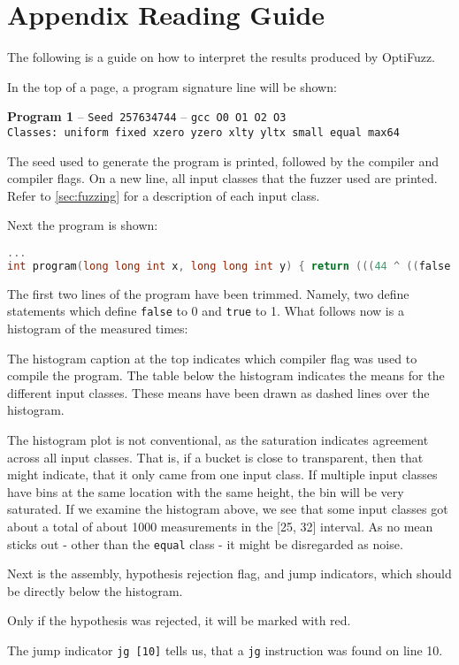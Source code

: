 \section*{Appendix Reading Guide}
The following is a guide on how to interpret the results produced by OptiFuzz. 

In the top of a page, a program signature line will be shown:
\begin{center}
    \textbf{Program 1} -- \texttt{Seed 257634744} -- \texttt{gcc O0 O1 O2 O3}\\\small\texttt{Classes: uniform fixed xzero yzero xlty yltx small equal max64}\\[2mm]
\end{center}
The seed used to generate the program is printed, followed by the compiler and compiler flags.
On a new line, all input classes that the fuzzer used are printed.
Refer to \ref{sec:fuzzing} for a description of each input class.

Next the program is shown:
\begin{lstlisting}[style=defstyle,language=C]
...
int program(long long int x, long long int y) { return (((44 ^ ((false >> (-874552120269441001 == x)) | ((53 * 29) >= (-5509653365268467218 ^ x)))) * 24) & (false + x)); }
\end{lstlisting}
The first two lines of the program have been trimmed. Namely, two define statements
which define \texttt{false} to 0 and \texttt{true} to 1.
What follows now is a histogram of the measured times:

The histogram caption at the top indicates which compiler flag was used to compile the program.
The table below the histogram indicates the means for the different input classes.
These means have been drawn as dashed lines over the histogram.

The histogram plot is not conventional, as the saturation indicates agreement across all input classes.
That is, if a bucket is close to transparent, then that might indicate, that it only came from one input class.
If multiple input classes have bins at the same location with the same height, the bin will be very saturated. 
If we examine the histogram above, we see that some input classes got about a total of about 1000 measurements in the [25, 32] interval.
As no mean sticks out - other than the \texttt{equal} class - it might be disregarded as noise.

Next is the assembly, hypothesis rejection flag, and jump indicators, which should be directly below the histogram.

Only if the hypothesis was rejected, it will be marked with red.

The jump indicator \texttt{jg [10]} tells us, that a \texttt{jg} instruction was found on line 10.

\newpage